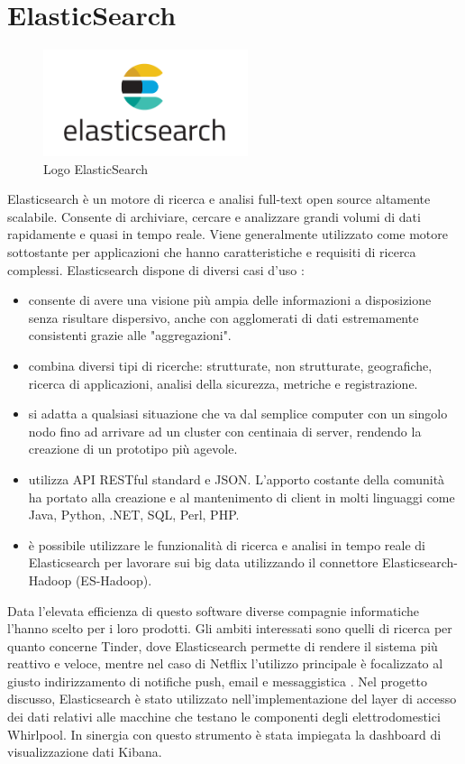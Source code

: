 \section{ElasticSearch}
\begin{figure}[ht!]
\begin{center}
  \includegraphics[width=6cm]{images/esearch.png}
  \caption{Logo ElasticSearch}
\end{center}
\end{figure}
Elasticsearch è un motore di ricerca e analisi full-text open source altamente scalabile. Consente di archiviare, cercare e analizzare grandi volumi di dati rapidamente e quasi in tempo reale. Viene generalmente utilizzato come motore sottostante per applicazioni che hanno caratteristiche e requisiti di ricerca complessi.
Elasticsearch dispone di diversi casi d'uso \cite{ELASTICSEARCH}:
\begin{itemize}
    \item consente di avere una visione più ampia delle informazioni a disposizione senza risultare dispersivo, anche con agglomerati di dati estremamente consistenti grazie alle "aggregazioni".
    \item combina diversi tipi di ricerche: strutturate, non strutturate, geografiche, ricerca di applicazioni, analisi della sicurezza, metriche e registrazione.
    \item si adatta a qualsiasi situazione che va dal semplice computer con un singolo nodo fino ad arrivare ad un cluster con centinaia di server, rendendo la creazione di un prototipo più agevole.
    \item utilizza API RESTful standard e JSON. L'apporto costante della comunità ha portato alla creazione e al mantenimento di client in molti linguaggi come Java, Python, .NET, SQL, Perl, PHP.
    \item è possibile utilizzare le funzionalità di ricerca e analisi in tempo reale di Elasticsearch per lavorare sui big data utilizzando il connettore Elasticsearch-Hadoop (ES-Hadoop).
\end{itemize}
Data l'elevata efficienza di questo software diverse compagnie informatiche l'hanno scelto per i loro prodotti. Gli ambiti interessati sono quelli di ricerca per quanto concerne Tinder, dove Elasticsearch permette di rendere il sistema più reattivo e veloce, mentre nel caso di Netflix l'utilizzo principale è focalizzato al giusto indirizzamento di notifiche push, email e messaggistica \cite{ELASTICSEARCH}.
Nel progetto discusso, Elasticsearch è stato utilizzato nell'implementazione del layer di accesso dei dati relativi alle macchine che testano le componenti degli elettrodomestici Whirlpool. In sinergia con questo strumento è stata impiegata la dashboard di visualizzazione dati Kibana.

